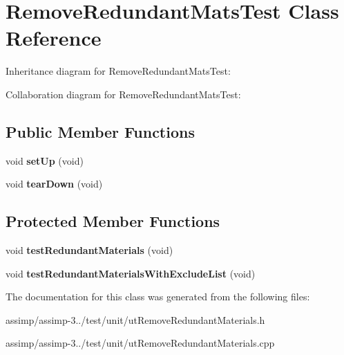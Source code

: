 \hypertarget{class_remove_redundant_mats_test}{\section{Remove\+Redundant\+Mats\+Test Class Reference}
\label{class_remove_redundant_mats_test}
}


Inheritance diagram for Remove\+Redundant\+Mats\+Test\+:


Collaboration diagram for Remove\+Redundant\+Mats\+Test\+:
\subsection*{Public Member Functions}
\begin{DoxyCompactItemize}
\item 
\hypertarget{class_remove_redundant_mats_test_a876d394a49dbdd26a80531315c59c65f}{void {\bfseries set\+Up} (void)}\label{class_remove_redundant_mats_test_a876d394a49dbdd26a80531315c59c65f}

\item 
\hypertarget{class_remove_redundant_mats_test_ac8ba97ca4724fbfb5439ffca0e35e080}{void {\bfseries tear\+Down} (void)}\label{class_remove_redundant_mats_test_ac8ba97ca4724fbfb5439ffca0e35e080}

\end{DoxyCompactItemize}
\subsection*{Protected Member Functions}
\begin{DoxyCompactItemize}
\item 
\hypertarget{class_remove_redundant_mats_test_a46d1d5848dee2fab24d3ba00694d18b5}{void {\bfseries test\+Redundant\+Materials} (void)}\label{class_remove_redundant_mats_test_a46d1d5848dee2fab24d3ba00694d18b5}

\item 
\hypertarget{class_remove_redundant_mats_test_afaead11681662e2232965dcef58477ca}{void {\bfseries test\+Redundant\+Materials\+With\+Exclude\+List} (void)}\label{class_remove_redundant_mats_test_afaead11681662e2232965dcef58477ca}

\end{DoxyCompactItemize}


The documentation for this class was generated from the following files\+:\begin{DoxyCompactItemize}
\item 
assimp/assimp-\/3../test/unit/ut\+Remove\+Redundant\+Materials.\+h\item 
assimp/assimp-\/3../test/unit/ut\+Remove\+Redundant\+Materials.\+cpp\end{DoxyCompactItemize}
